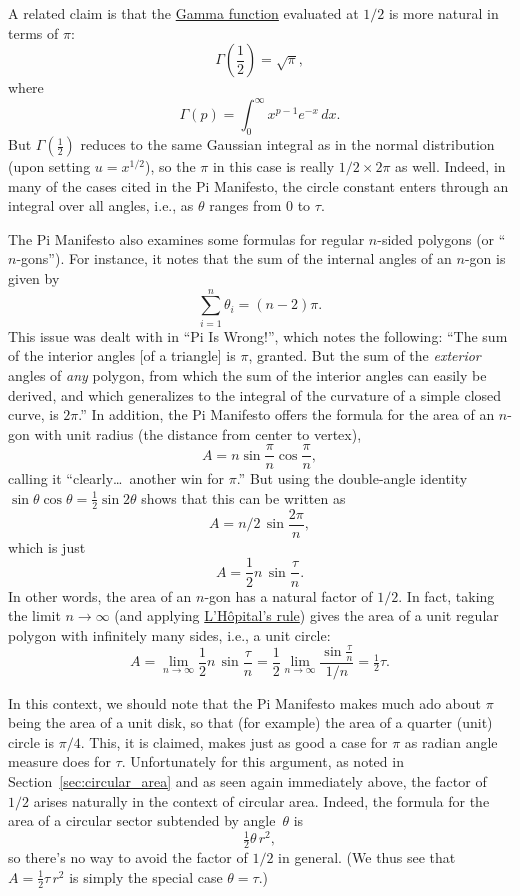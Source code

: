 A related claim is that the \href{http://mathworld.wolfram.com/GammaFunction.html}{Gamma function} evaluated at $1/2$ is more natural in terms of $\pi$:
\[
\Gamma(\textstyle{\frac{1}{2}}) = \sqrt{\pi},
\]
where
\[
\Gamma(p) = \int_{0}^{\infty} x^{p-1} e^{-x}\,dx.
\]
But $\Gamma(\frac{1}{2})$ reduces to the same Gaussian integral as in the normal distribution (upon setting $u =
x^{1/2}$), so the $\pi$ in this case is really $1/2\times 2\pi$ as well. Indeed, in many of the cases cited in the Pi Manifesto,
the circle constant enters through an integral over all angles, i.e.,
as $\theta$ ranges from $0$ to $\tau$.

The Pi Manifesto also examines some formulas for regular
$n$-sided polygons (or ``$n$-gons''). For instance, it notes that the sum of the internal angles of an $n$-gon is given by
\[
\sum_{i=1}^n \theta_i=(n-2)\pi.
\]
This issue was dealt with in ``Pi Is Wrong!'', which notes the following: ``The sum of the interior angles [of a
triangle] is $\pi$, granted. But the sum of the \emph{exterior} angles of \emph{any}
polygon, from which the sum of the interior angles can easily be
derived, and which generalizes to the integral of the curvature of a
simple closed curve, is $2\pi$.'' In addition, the Pi Manifesto offers the formula for the area of an $n$-gon with unit radius (the distance from center to vertex),
\[ A=n\sin\frac{\pi}{n}\cos\frac{\pi}{n}, \]
calling it ``clearly\ldots\ another win for $\pi$.'' But using the double-angle identity $\sin\theta\cos\theta = \frac{1}{2} \sin 2\theta$ shows that this can be written as
\[ A = n/2\, \sin\frac{2\pi}{n}, \]
which is just
\[ A = \frac{1}{2} n\, \sin\frac{\tau}{n}. \]
In other words, the area of an $n$-gon has a natural
factor of $1/2$. In fact, taking the limit $n\rightarrow \infty$ (and applying \href{http://mathworld.wolfram.com/LHospitalsRule.html}{L'H\^{o}pital's rule}) gives the area of a unit regular polygon with infinitely many sides, i.e., a unit circle:
\[
A = \lim_{n\rightarrow\infty} \frac{1}{2} n\, \sin\frac{\tau}{n}
= \frac{1}{2} \lim_{n\rightarrow\infty} \frac{\sin\frac{\tau}{n}}{1/n} = \tfrac{1}{2}\tau.
\]

In this context, we should note that the Pi Manifesto makes much ado about $\pi$ being the area of a unit disk, so that (for example) the area of a quarter (unit) circle is $\pi/4$. This, it is claimed, makes just as good a case for $\pi$ as radian angle measure does for $\tau$. Unfortunately for this argument, as noted in Section~\ref{sec:circular_area} and as seen again immediately above, the factor of $1/2$ arises naturally in the context of circular area. Indeed, the formula for the area of a circular sector subtended by angle~$\theta$ is
\[
\tfrac{1}{2}\theta\, r^2,
\]
so there's no way to avoid the factor of $1/2$ in general. (We thus see that $A =
\frac{1}{2} \tau\, r^2$ is simply the special case $\theta = \tau$.)


